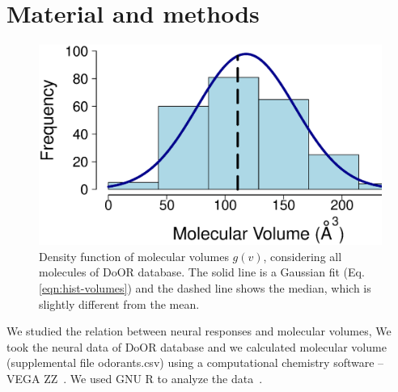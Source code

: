 \documentclass[11pt]{paper} %
\begin{document}

 
 

\section*{Material and methods}
\begin{figure}
	\centering
	\includegraphics[width=0.5 \textwidth]{hist-volumes}
	\caption{Density function of molecular volumes $g(v)$, considering all molecules of DoOR database. 
		The solid line is a Gaussian fit (Eq. \ref{eqn:hist-volumes}) and the dashed line shows the median, 
		which is slightly different from  the mean.}
	\label{fig:hist-volumes}
\end{figure}

We studied the relation between neural responses and molecular volumes, 
We took the neural data of DoOR database \cite{Galizia2010} and we calculated molecular volume (supplemental file odorants.csv) using a computational chemistry software -- VEGA ZZ~\cite{Pedretti2004}. 
We used  GNU R to analyze the data~\cite{Rlanguage}.
\end{document}
